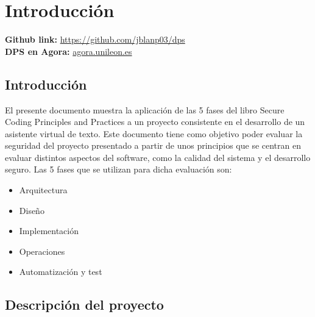 \chapter{Introducción}
\label{chap:introduction}


\begin{center}
    \begin{minipage}{.85\linewidth}
    \begin{linkbox}
        \textbf{Github link:} \url{https://github.com/jblanp03/dps}\\
        \textbf{DPS en Agora:}
        \href{https://agora.unileon.es/course/view.php?id=3060}{agora.unileon.es} \\
       
    \end{linkbox}
    \end{minipage}
\end{center}




\section{Introducción}

El presente documento muestra la aplicación de las 5 fases del libro Secure Coding Principles and  Practices \cite{wikimedia:2017} a un proyecto consistente en el desarrollo de un asistente virtual de texto. Este documento tiene como objetivo poder evaluar la seguridad del proyecto presentado a partir de unos principios que se centran en evaluar distintos aspectos del software, como la calidad del sistema y el desarrollo seguro. Las 5 fases que se utilizan para dicha evaluación son:

\begin{itemize}
    \item Arquitectura
    \item Diseño
    \item Implementación
    \item Operaciones
    \item Automatización y test
\end{itemize}




\section{Descripción del proyecto}

